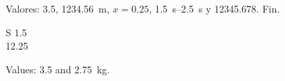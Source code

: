 \documentclass{article}
\begin{document}
Valores: \num{3.5}, \SI{1234.56}{\metre}, $x = \num{0.25}$, \SIrange{1.5}{2.5}{\second} y \num{12345.678}. Fin.

\begin{tabular}{S}
1.5 \\
12.25 \\
\end{tabular}

\foreignlanguage{english}{Values: \num{3.5} and \SI{2.75}{\kilo\gram}.}
\end{document}
